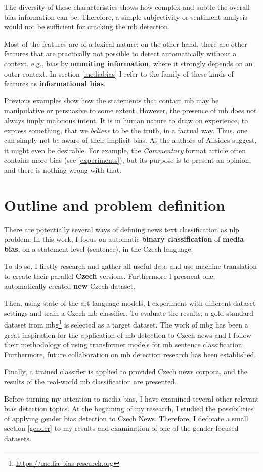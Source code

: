 The diversity of these characteristics shows how complex and subtle the overall bias information can be. Therefore, a simple subjectivity or sentiment analysis would not be sufficient for cracking the \gls{mb} detection. 

Most of the features are of a lexical nature; on the other hand, there are other features that are practically not possible to detect automatically without a context, e.g., bias by \textbf{ommiting information}, where it strongly depends on an outer context. In section \ref{mediabias} I refer to the family of these kinds of features as \textbf{informational bias}.


Previous examples show how the statements that contain \gls{mb} may be manipulative or persuasive to some extent. However, the presence of \gls{mb} does not always imply malicious intent. It is in human nature to draw on experience, to express something, that we \textit{believe} to be the truth, in a factual way. Thus, one can simply not be aware of their implicit bias. As the authors of Allsides suggest, it might even be desirable. For example, the \textit{Commentary} format article often contains more bias (see \ref{experiments}), but its purpose is to present an opinion, and there is nothing wrong with that.


\section{Outline and problem definition}
There are potentially several ways of defining news text classification as \gls{nlp} problem.
In this work, I focus on automatic \textbf{binary classification} of \textbf{media bias}, on a statement level (sentence), in the Czech language.

To do so, I firstly research and gather all useful data and use machine translation to create their parallel \textbf{Czech} versions. Furthermore I presnent one, automatically created \textbf{new} Czech dataset. 

Then, using state-of-the-art language models, I experiment with different dataset settings and train a Czech \gls{mb} classifier. To evaluate the results, a gold standard dataset from \gls{mbg}\footnote{\url{https://media-bias-research.org}} is selected as a target dataset. The work of \gls{mbg} has been a great inspiration for the application of \gls{mb} detection to Czech news and I follow their methodology of using transformer models for \gls{mb} sentence classification. Furthermore, future collaboration on \gls{mb} detection research has been established.

Finally, a trained classifier is applied to provided Czech news corpora, and the results of the real-world \gls{mb} classification are presented.

Before turning my attention to media bias, I have examined several other relevant bias detection topics. At the beginning of my research, I studied the possibilities of applying gender bias detection to Czech News. Therefore, I dedicate a small section \ref{gender} to my results and examination of one of the gender-focused datasets.



